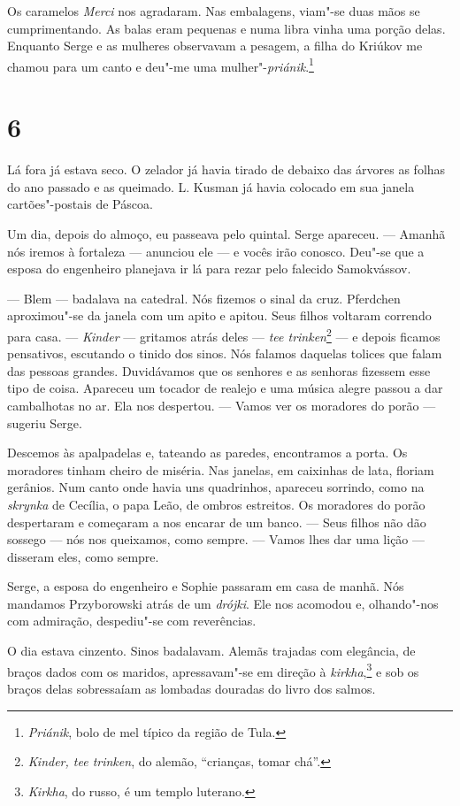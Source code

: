 Os caramelos \emph{Merci} nos agradaram. Nas embalagens, viam"-se duas
mãos se cumprimentando. As balas eram pequenas e numa libra vinha uma
porção delas. Enquanto Serge e as mulheres observavam a pesagem, a filha
do Kriúkov me chamou para um canto e deu"-me uma
mulher"-\emph{priánik}.\footnote{\emph{Priánik}, bolo de mel típico da
  região de Tula.}

\section{6}

Lá fora já estava seco. O zelador já havia tirado de debaixo das árvores
as folhas do ano passado e as queimado. L. Kusman já havia colocado em
sua janela cartões"-postais de Páscoa.

Um dia, depois do almoço, eu passeava pelo quintal. Serge apareceu. ---
Amanhã nós iremos à fortaleza --- anunciou ele --- e vocês irão conosco.
Deu"-se que a esposa do engenheiro planejava ir lá para rezar pelo
falecido Samokvássov.

--- Blem --- badalava na catedral. Nós fizemos o sinal da cruz.
Pferdchen aproximou"-se da janela com um apito e apitou. Seus filhos
voltaram correndo para casa. --- \emph{Kinder} --- gritamos atrás deles
--- \emph{tee trinken}\footnote{\emph{Kinder, tee trinken}, do alemão,
  ``crianças, tomar chá''.} --- e depois ficamos pensativos, escutando o
tinido dos sinos. Nós falamos daquelas tolices que falam das pessoas
grandes. Duvidávamos que os senhores e as senhoras fizessem esse tipo de
coisa. Apareceu um tocador de realejo e uma música alegre passou a dar
cambalhotas no ar. Ela nos despertou. --- Vamos ver os moradores do
porão --- sugeriu Serge.

Descemos às apalpadelas e, tateando as paredes, encontramos a porta. Os
moradores tinham cheiro de miséria. Nas janelas, em caixinhas de lata,
floriam gerânios. Num canto onde havia uns quadrinhos, apareceu
sorrindo, como na \emph{skrynka} de Cecília, o papa Leão, de ombros
estreitos. Os moradores do porão despertaram e começaram a nos encarar
de um banco. --- Seus filhos não dão sossego --- nós nos queixamos, como
sempre. --- Vamos lhes dar uma lição --- disseram eles, como sempre.

Serge, a esposa do engenheiro e Sophie passaram em casa de manhã. Nós
mandamos Przyborowski atrás de um \emph{drójki}. Ele nos acomodou e,
olhando"-nos com admiração, despediu"-se com reverências.

O dia estava cinzento. Sinos badalavam. Alemãs trajadas com elegância,
de braços dados com os maridos, apressavam"-se em direção à
\emph{kirkha},\footnote{\emph{Kirkha}, do russo, é um templo luterano.}
e sob os braços delas sobressaíam as lombadas douradas do livro dos
salmos.

